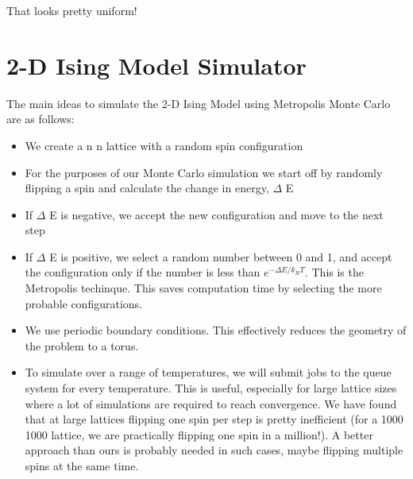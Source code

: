 \documentclass{article}
\begin{document}
That looks pretty uniform!



\section{2-D Ising Model Simulator}
\label{sec-3}

The main ideas to simulate the 2-D Ising Model using Metropolis Monte Carlo are as follows:

\begin{itemize}
\item We create a n \texttimes{} n lattice with a random spin configuration

\item For the purposes of our Monte Carlo simulation we start off by randomly flipping a spin and calculate the change in energy, $\Delta$ E

\item If $\Delta$ E is negative, we accept the new configuration and move to the next step

\item If $\Delta$ E is positive, we select a random number between 0 and 1, and accept the configuration only if the number is less than \(e^{-\Delta E / k_{B}T}\). This is the Metropolis techinque. This saves computation time by selecting the more probable configurations.

\item We use periodic boundary conditions. This effectively reduces the geometry of the problem to a torus.

\item To simulate over a range of temperatures, we will submit jobs to the queue system for every temperature.  This is useful, especially for large lattice sizes where a lot of simulations are required to reach convergence. We have found that at large lattices flipping one spin per step is pretty inefficient (for a 1000 \texttimes{} 1000 lattice, we are practically flipping one spin in a million!). A better approach than ours is probably needed in such cases, maybe flipping multiple spins at the same time.
\end{itemize}
\end{document}
